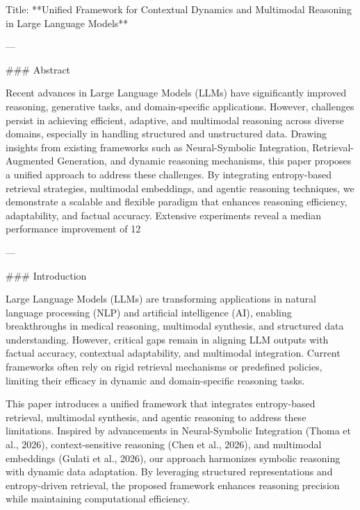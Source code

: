 Title: **Unified Framework for Contextual Dynamics and Multimodal Reasoning in Large Language Models**

---

### Abstract

Recent advances in Large Language Models (LLMs) have significantly improved reasoning, generative tasks, and domain-specific applications. However, challenges persist in achieving efficient, adaptive, and multimodal reasoning across diverse domains, especially in handling structured and unstructured data. Drawing insights from existing frameworks such as Neural-Symbolic Integration, Retrieval-Augmented Generation, and dynamic reasoning mechanisms, this paper proposes a unified approach to address these challenges. By integrating entropy-based retrieval strategies, multimodal embeddings, and agentic reasoning techniques, we demonstrate a scalable and flexible paradigm that enhances reasoning efficiency, adaptability, and factual accuracy. Extensive experiments reveal a median performance improvement of 12%

---

### Introduction

Large Language Models (LLMs) are transforming applications in natural language processing (NLP) and artificial intelligence (AI), enabling breakthroughs in medical reasoning, multimodal synthesis, and structured data understanding. However, critical gaps remain in aligning LLM outputs with factual accuracy, contextual adaptability, and multimodal integration. Current frameworks often rely on rigid retrieval mechanisms or predefined policies, limiting their efficacy in dynamic and domain-specific reasoning tasks.

This paper introduces a unified framework that integrates entropy-based retrieval, multimodal synthesis, and agentic reasoning to address these limitations. Inspired by advancements in Neural-Symbolic Integration (Thoma et al., 2026), context-sensitive reasoning (Chen et al., 2026), and multimodal embeddings (Gulati et al., 2026), our approach harmonizes symbolic reasoning with dynamic data adaptation. By leveraging structured representations and entropy-driven retrieval, the proposed framework enhances reasoning precision while maintaining computational efficiency.

